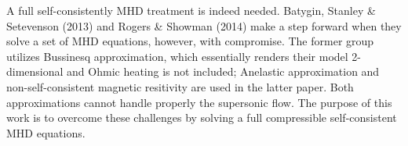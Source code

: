 \documentclass[11pt]{article}
\begin{document}
\begin{enumerate}
A full self-consistently MHD treatment is indeed needed. Batygin, Stanley \& Setevenson (2013) and Rogers \& Showman (2014) make a step forward when they solve a set of MHD equations, however, with compromise. The former group utilizes Bussinesq approximation, which essentially renders their model 2-dimensional and Ohmic heating is not included; Anelastic approximation and non-self-consistent magnetic resitivity are used in the latter paper. Both approximations cannot handle properly the supersonic flow. The purpose of this work is to overcome these challenges by solving a full compressible self-consistent MHD equations. 

\end{enumerate}
\end{document}
